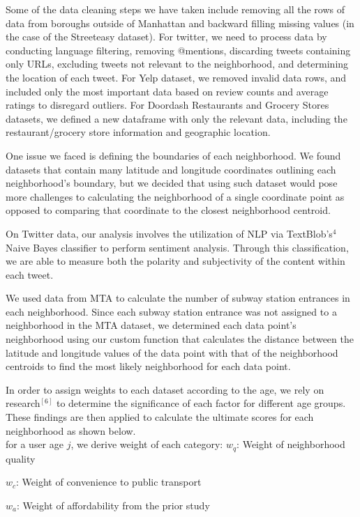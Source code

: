 \documentclass{article}
\begin{document}
Some of the data cleaning steps we have taken include removing all the rows of data from boroughs outside of Manhattan and backward filling missing values (in the case of the Streeteasy dataset). For twitter, we need to process data by conducting language filtering, removing @mentions, discarding tweets containing only URLs, excluding tweets not relevant to the neighborhood, and determining the location of each tweet. For Yelp dataset, we removed invalid data rows, and included only the most important data based on review counts and average ratings to disregard outliers. For Doordash Restaurants and Grocery Stores datasets, we defined a new dataframe with only the relevant data, including the restaurant/grocery store information and geographic location. 

One issue we faced is defining the boundaries of each neighborhood.  We found datasets that contain many latitude and longitude coordinates outlining each neighborhood’s boundary, but we decided that using such dataset would pose more challenges to calculating the neighborhood of a single coordinate point as opposed to comparing that coordinate to the closest neighborhood centroid.

On Twitter data, our analysis involves the utilization of NLP via TextBlob's$^{4}$ Naive Bayes classifier to perform sentiment analysis. Through this classification, we are able to measure both the polarity and subjectivity of the content within each tweet.

We used data from MTA to calculate the number of subway station entrances in each neighborhood.  Since each subway station entrance was not assigned to a neighborhood in the MTA dataset, we determined each data point's neighborhood using our custom function that calculates the distance between the latitude and longitude values of the data point with that of the neighborhood centroids to find the most likely neighborhood for each data point.

In order to assign weights to each dataset according to the age, we rely on research$^{[6]}$ to determine the significance of each factor for different age groups. These findings are then applied to calculate the ultimate scores for each neighborhood as shown below.\\
for a user age $j$, we derive weight of each category:
\newpage
$w_q$: Weight of neighborhood quality

$w_c$: Weight of convenience to public transport

$w_a$: Weight of affordability from the prior study
\end{document}
